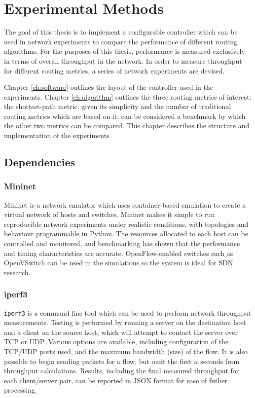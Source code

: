 \chapter{Experimental Methods}
\label{ch:methods}

The goal of this thesis is to implement a configurable controller which can be used in network experiments to compare the performance of different routing algorithms. For the purposes of this thesis, performance is measured exclusively in terms of overall throughput in the network. In order to measure throughput for different routing metrics, a series of network experiments are devised. 

Chapter \ref{ch:software} outlines the layout of the controller used in the experiments. Chapter \ref{ch:algorithm} outlines the three routing metrics of interest: the shortest-path metric, given its simplicity and the number of traditional routing metrics which are based on it, can be considered a benchmark by which the other two metrics can be compared. This chapter describes the structure and implementation of the experiments.

\section{Dependencies}
\subsection{Mininet}
Mininet is a network emulator which uses container-based emulation \cite{handigol:mininet} to create a virtual network of hosts and switches. Mininet makes it simple to run reproducible network experiments under realistic conditions, with topologies and behaviour programmable in Python. The resources allocated to each host can be controlled and monitored, and benchmarking \cite{handigol:benchmarks} has shown that the performance and timing characteristics are accurate. OpenFlow-enabled switches such as OpenVSwitch can be used in the simulations so the system is ideal for SDN research.

\subsection{iperf3}
\texttt{iperf3} \cite{iperf} is a command line tool which can be used to perform network throughput measurements. Testing is performed by running a server on the destination host and a client on the source host, which will attempt to contact the server over TCP or UDP. Various options are available, including configuration of the TCP/UDP ports used, and the maximum bandwidth (size) of the flow. It is also possible to begin sending packets for a flow, but omit the first $n$ seconds from throughput calculations. Results, including the final measured throughput for each client/server pair, can be reported in JSON format for ease of futher processing.


